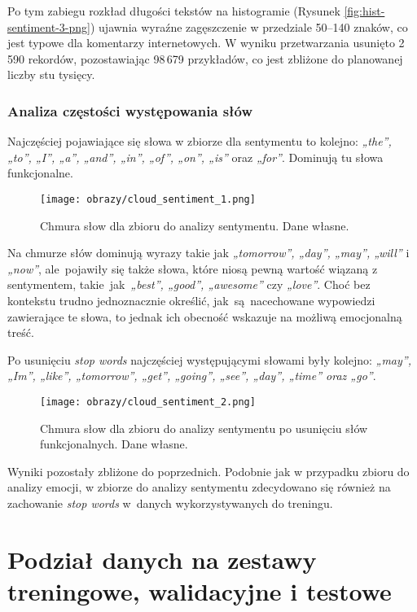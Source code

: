 Po tym zabiegu rozkład długości tekstów na histogramie (Rysunek \ref{fig:hist-sentiment-3-png}) ujawnia wyraźne zagęszczenie w przedziale 50--140 znaków, co jest typowe dla komentarzy internetowych. W wyniku przetwarzania usunięto 2\,590 rekordów, pozostawiając 98\,679 przykładów, co jest zbliżone do planowanej liczby stu tysięcy.

\subsubsection{Analiza częstości występowania słów}
Najczęściej pojawiające się słowa w zbiorze dla sentymentu to kolejno: \textit{„the”, „to”, „I”, „a”, „and”, „in”, „of”, „on”, „is”} oraz \textit{„for”}. Dominują tu słowa funkcjonalne.

\begin{figure}[H]
    \centering
    \texttt{[image: obrazy/cloud\_sentiment\_1.png]}
    \caption{Chmura słow dla zbioru do analizy sentymentu. Dane własne.}
    \label{fig:cloud-sentiment-1-png}
\end{figure}
Na chmurze słów dominują wyrazy takie jak \textit{„tomorrow”, „day”, „may”, „will”} i \textit{„now”}, ale~pojawiły się także słowa, które niosą pewną wartość wiązaną z sentymentem, takie~jak~\textit{„best”, „good”, „awesome”} czy \textit{„love”}. Choć bez kontekstu trudno jednoznacznie określić, jak~są~nacechowane wypowiedzi zawierające te słowa, to jednak ich obecność wskazuje na możliwą emocjonalną treść.

Po usunięciu \textit{stop words} najczęściej występującymi słowami były kolejno: \textit{„may”, „Im”, „like”, „tomorrow”, „get”, „going”, „see”, „day”, „time” oraz „go”}.

\begin{figure}[H]
    \centering
    \texttt{[image: obrazy/cloud\_sentiment\_2.png]}
    \caption{Chmura słow dla zbioru do analizy sentymentu po usunięciu słów funkcjonalnych. Dane własne.}
    \label{fig:cloud-sentiment-2-png}
\end{figure}

Wyniki pozostały zbliżone do poprzednich. Podobnie jak w przypadku zbioru do analizy emocji, w zbiorze do analizy sentymentu zdecydowano się również na zachowanie \textit{stop words} w~danych wykorzystywanych do treningu.

\section{Podział danych na zestawy treningowe, walidacyjne i testowe}

